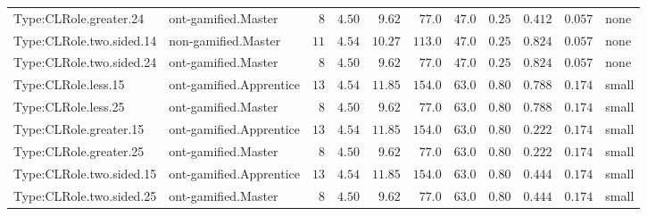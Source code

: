 \documentclass[6pt,a4paper]{article}
\begin{document}
{\begin{longtable}{llrrrrrrrrl}
Type:CLRole.greater.24&ont-gamified.Master&$ 8$&$4.50$&$ 9.62$&$ 77.0$&$ 47.0$&$ 0.25$&$0.412$&$0.057$&none\tabularnewline
Type:CLRole.two.sided.14&non-gamified.Master&$11$&$4.54$&$10.27$&$113.0$&$ 47.0$&$ 0.25$&$0.824$&$0.057$&none\tabularnewline
Type:CLRole.two.sided.24&ont-gamified.Master&$ 8$&$4.50$&$ 9.62$&$ 77.0$&$ 47.0$&$ 0.25$&$0.824$&$0.057$&none\tabularnewline
Type:CLRole.less.15&ont-gamified.Apprentice&$13$&$4.54$&$11.85$&$154.0$&$ 63.0$&$ 0.80$&$0.788$&$0.174$&small\tabularnewline
Type:CLRole.less.25&ont-gamified.Master&$ 8$&$4.50$&$ 9.62$&$ 77.0$&$ 63.0$&$ 0.80$&$0.788$&$0.174$&small\tabularnewline
Type:CLRole.greater.15&ont-gamified.Apprentice&$13$&$4.54$&$11.85$&$154.0$&$ 63.0$&$ 0.80$&$0.222$&$0.174$&small\tabularnewline
Type:CLRole.greater.25&ont-gamified.Master&$ 8$&$4.50$&$ 9.62$&$ 77.0$&$ 63.0$&$ 0.80$&$0.222$&$0.174$&small\tabularnewline
\newpage
Type:CLRole.two.sided.15&ont-gamified.Apprentice&$13$&$4.54$&$11.85$&$154.0$&$ 63.0$&$ 0.80$&$0.444$&$0.174$&small\tabularnewline
Type:CLRole.two.sided.25&ont-gamified.Master&$ 8$&$4.50$&$ 9.62$&$ 77.0$&$ 63.0$&$ 0.80$&$0.444$&$0.174$&small\tabularnewline
\hline
\end{longtable}}
\end{document}
